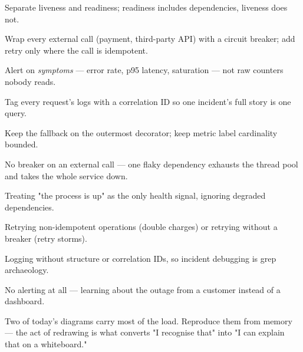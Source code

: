 \begin{bestpractices}
\begin{wbitem}
  \item Separate liveness and readiness; readiness includes dependencies, liveness does not.
  \item Wrap every external call (payment, third-party API) with a circuit breaker; add retry only where the call is idempotent.
  \item Alert on \emph{symptoms} --- error rate, p95 latency, saturation --- not raw counters nobody reads.
  \item Tag every request's logs with a correlation ID so one incident's full story is one query.
  \item Keep the fallback on the outermost decorator; keep metric label cardinality bounded.
\end{wbitem}
\end{bestpractices}
\begin{mistakes}
\begin{wbitem}
  \item No breaker on an external call --- one flaky dependency exhausts the thread pool and takes the whole service down.
  \item Treating "the process is up" as the only health signal, ignoring degraded dependencies.
  \item Retrying non-idempotent operations (double charges) or retrying without a breaker (retry storms).
  \item Logging without structure or correlation IDs, so incident debugging is grep archaeology.
  \item No alerting at all --- learning about the outage from a customer instead of a dashboard.
\end{wbitem}
\end{mistakes}


Two of today's diagrams carry most of the load. Reproduce them from memory --- the act of redrawing is what converts "I recognise that" into "I can explain that on a whiteboard."

\begin{writespace}
\end{writespace}

\begin{writespace}
\end{writespace}

